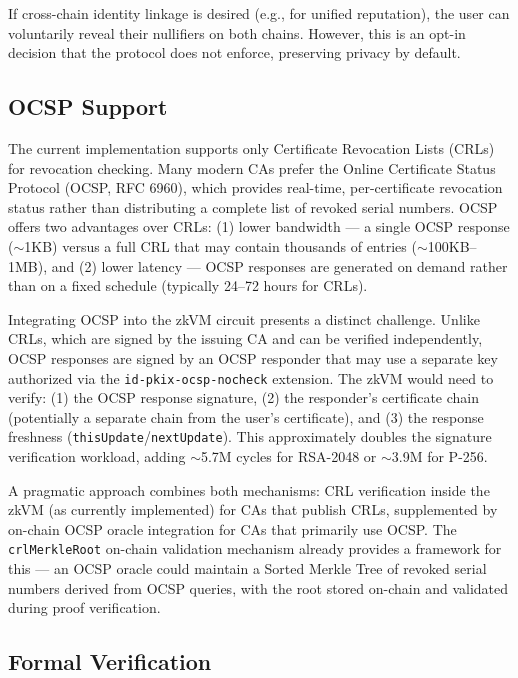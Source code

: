 \documentclass[11pt, a4paper]{article}
\begin{document}
If cross-chain identity linkage is desired (e.g., for unified
reputation), the user can voluntarily reveal their nullifiers on both
chains. However, this is an opt-in decision that the protocol does not
enforce, preserving privacy by default.

\subsection{OCSP Support}\label{ocsp-support}

The current implementation supports only Certificate Revocation Lists
(CRLs) for revocation checking. Many modern CAs prefer the Online
Certificate Status Protocol (OCSP, RFC 6960), which provides real-time,
per-certificate revocation status rather than distributing a complete
list of revoked serial numbers. OCSP offers two advantages over CRLs:
(1) lower bandwidth --- a single OCSP response ($\sim$1KB)
versus a full CRL that may contain thousands of entries
($\sim$100KB--1MB), and (2) lower latency --- OCSP responses
are generated on demand rather than on a fixed schedule (typically
24--72 hours for CRLs).

Integrating OCSP into the zkVM circuit presents a distinct challenge.
Unlike CRLs, which are signed by the issuing CA and can be verified
independently, OCSP responses are signed by an OCSP responder that may
use a separate key authorized via the \texttt{id-pkix-ocsp-nocheck}
extension. The zkVM would need to verify: (1) the OCSP response
signature, (2) the responder's certificate chain (potentially a separate
chain from the user's certificate), and (3) the response freshness
(\texttt{thisUpdate}/\texttt{nextUpdate}). This approximately doubles
the signature verification workload, adding $\sim$5.7M cycles
for RSA-2048 or $\sim$3.9M for P-256.

A pragmatic approach combines both mechanisms: CRL verification inside
the zkVM (as currently implemented) for CAs that publish CRLs,
supplemented by on-chain OCSP oracle integration for CAs that primarily
use OCSP. The \texttt{crlMerkleRoot} on-chain validation mechanism
already provides a framework for this --- an OCSP oracle could maintain
a Sorted Merkle Tree of revoked serial numbers derived from OCSP
queries, with the root stored on-chain and validated during proof
verification.

\subsection{Formal Verification}\label{formal-verification}
\end{document}
